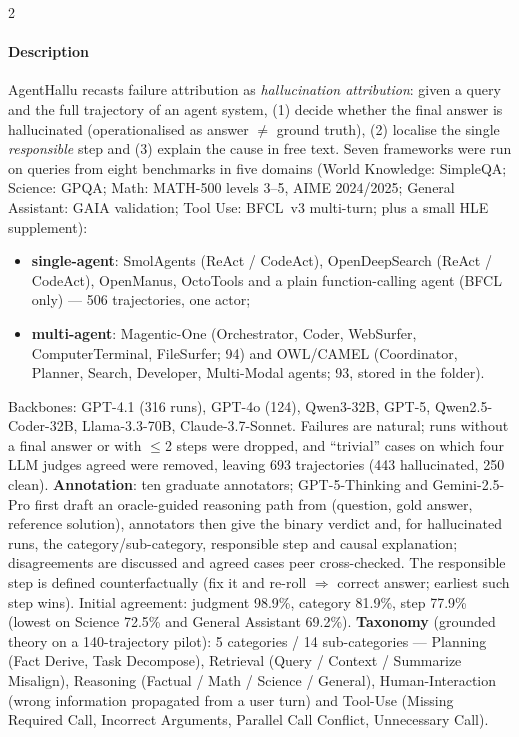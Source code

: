\begin{multicols}{2}
\paragraph{Description} AgentHallu recasts failure attribution as \emph{hallucination attribution}: given a query and the full trajectory of an agent system, (1) decide whether the final answer is hallucinated (operationalised as answer $\neq$ ground truth), (2) localise the single \emph{responsible} step and (3) explain the cause in free text. Seven frameworks were run on queries from eight benchmarks in five domains (World Knowledge: SimpleQA; Science: GPQA; Math: MATH-500 levels 3--5, AIME 2024/2025; General Assistant: GAIA validation; Tool Use: BFCL~v3 multi-turn; plus a small HLE supplement):
\begin{itemize}
\item \textbf{single-agent}: SmolAgents (ReAct / CodeAct), OpenDeepSearch (ReAct / CodeAct), OpenManus, OctoTools and a plain function-calling agent (BFCL only) --- 506 trajectories, one actor;
\item \textbf{multi-agent}: Magentic-One (Orchestrator, Coder, WebSurfer, ComputerTerminal, FileSurfer; 94) and OWL/CAMEL (Coordinator, Planner, Search, Developer, Multi-Modal agents; 93, stored in the  folder).
\end{itemize}
Backbones: GPT-4.1 (316 runs), GPT-4o (124), Qwen3-32B, GPT-5, Qwen2.5-Coder-32B, Llama-3.3-70B, Claude-3.7-Sonnet. Failures are natural; runs without a final answer or with $\le$2 steps were dropped, and ``trivial'' cases on which four LLM judges agreed were removed, leaving 693 trajectories (443 hallucinated, 250 clean). \textbf{Annotation}: ten graduate annotators; GPT-5-Thinking and Gemini-2.5-Pro first draft an oracle-guided reasoning path from (question, gold answer, reference solution), annotators then give the binary verdict and, for hallucinated runs, the category/sub-category, responsible step and causal explanation; disagreements are discussed and agreed cases peer cross-checked. The responsible step is defined counterfactually (fix it and re-roll $\Rightarrow$ correct answer; earliest such step wins). Initial agreement: judgment 98.9\%, category 81.9\%, step 77.9\% (lowest on Science 72.5\% and General Assistant 69.2\%). \textbf{Taxonomy} (grounded theory on a 140-trajectory pilot): 5 categories / 14 sub-categories --- Planning (Fact Derive, Task Decompose), Retrieval (Query / Context / Summarize Misalign), Reasoning (Factual / Math / Science / General), Human-Interaction (wrong information propagated from a user turn) and Tool-Use (Missing Required Call, Incorrect Arguments, Parallel Call Conflict, Unnecessary Call).


\end{multicols}
